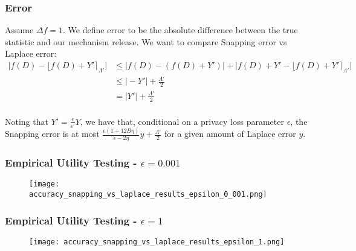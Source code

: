 \documentclass{beamer}
\begin{document}
\begin{frame}[shrink=20]
    \frametitle{Error}
    Assume $\Delta f = 1$. We define error to be the absolute difference between the true statistic and our mechanism
    release. We want to compare Snapping error vs Laplace error:
    \begin{align*}
        \big\vert f(D) - \lfloor f(D) + Y' \rceil_{\Lambda'} \big\vert \nonumber &\leq \big\vert f(D) - (f(D) + Y') \big\vert + \big\vert f(D) + Y' - \lfloor f(D) + Y' \rceil_{\Lambda'} \big\vert \\
                                                                                &\leq \vert -Y' \vert + \frac{\Lambda'}{2} \\
                                                                                &= \vert Y' \vert + \frac{\Lambda'}{2} \\
    \end{align*}

    Noting that $Y' = \frac{\epsilon}{\epsilon'}Y$, we have that, conditional on a privacy loss parameter $\epsilon$,
    the Snapping error is at most
    $\frac{\epsilon (1 + 12B \eta)}{\epsilon - 2\eta}y + \frac{\Lambda'}{2}$
    for a given amount of Laplace error $y$.
\end{frame}

\begin{frame}
    \frametitle{Empirical Utility Testing - $\epsilon = 0.001$}
    \begin{figure}
        \texttt{[image: accuracy\_snapping\_vs\_laplace\_results\_epsilon\_0\_001.png]}
    \end{figure}
\end{frame}

\begin{frame}
    \frametitle{Empirical Utility Testing - $\epsilon = 1$}
    \begin{figure}
        \texttt{[image: accuracy\_snapping\_vs\_laplace\_results\_epsilon\_1.png]}
    \end{figure}
\end{frame}
\end{document}
